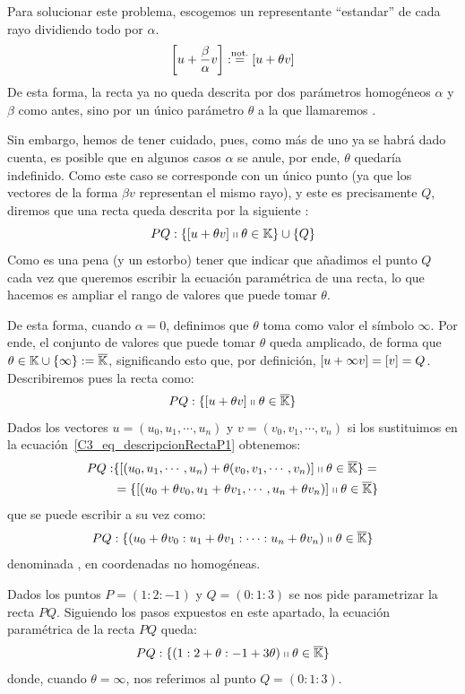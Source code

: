 Para solucionar este problema, escogemos un representante ``estandar'' de cada rayo dividiendo todo por $\alpha$.
\[\left [ u+\frac{\beta}{\alpha}v \right ]:\stackrel{\textrm{not.}}{=}\left [ u+\theta v \right ]\]
De esta forma, la recta ya no queda descrita por dos parámetros homogéneos $\alpha$ y $\beta$ como antes, sino por un único parámetro $\theta$ a la que llamaremos .
	
Sin embargo, hemos de tener cuidado, pues, como más de uno ya se habrá dado cuenta, es posible que en algunos casos $\alpha$ se anule, por ende, $\theta$ quedaría indefinido. Como este caso se corresponde con un único punto (ya que los vectores de la forma $\beta v$ representan el mismo rayo), y este es precisamente $Q$, diremos que una recta queda descrita por la siguiente :
\begin{equation}
	\label{C3_eq_descripcionRecta}
	PQ:\{\left [ u+\theta v \right ]\shortparallel \theta\in\mathbb{K}\}\cup\{Q\}
\end{equation}
Como es una pena (y un estorbo) tener que indicar que añadimos el punto $Q$ cada vez que queremos escribir la ecuación paramétrica de una recta, lo que hacemos es ampliar el rango de valores que puede tomar $\theta$.

De esta forma, cuando $\alpha=0$, definimos que $\theta$ toma como valor el símbolo $\infty$. Por ende, el conjunto de valores que puede tomar $\theta$ queda amplicado, de forma que $\theta\in\mathbb{K}\cup\{\infty\}:=\overline{\mathbb{K}}$, significando esto que, por definición, $\left [ u+\infty v \right ]=\left [ v \right ]=Q$. Describiremos pues la recta como:
\begin{equation}
	\label{C3_eq_descripcionRectaP1}
	PQ:\{\left [ u+\theta v \right ]\shortparallel \theta\in\overline{\mathbb{K}}\}
\end{equation}
Dados los vectores $u=(u_0,u_1,\cdots,u_n)$ y $v=(v_0,v_1,\cdots,v_n)$ si los sustituimos en la ecuación~\eqref{C3_eq_descripcionRectaP1} obtenemos:
\begin{equation*}
	\label{C_3_eq_parametrica_recta}
	\begin{split}
		PQ:&\{\left [ (u_0,u_1,\cdots,u_n)+\theta(v_0,v_1,\cdots,v_n) \right ]\shortparallel \theta\in\overline{\mathbb{K}}\}=\\
		&=\{\left [ (u_0+\theta v_0,u_1+\theta v_1,\cdots,u_n+\theta v_n) \right ]\shortparallel \theta\in\overline{\mathbb{K}}\}
	\end{split}
\end{equation*}
que se puede escribir a su vez como: 
\begin{equation}
	PQ:\{(u_0+\theta v_0:u_1+\theta v_1:\cdots:u_n+\theta v_n)\shortparallel \theta\in\overline{\mathbb{K}}\}
\end{equation}
denominada , en coordenadas no homogéneas.
\begin{exa}
	\label{C3_exa_rectaConcreta}
	Dados los puntos $P=(1:2:-1)$ y $Q=(0:1:3)$ se nos pide parametrizar la recta $PQ$. Siguiendo los pasos expuestos en este apartado, la ecuación paramétrica de la recta $PQ$ queda:
	\[
	PQ:\{(1:2+\theta:-1+3\theta)\shortparallel\theta\in\overline{\mathbb{K}}\}
	\]
	donde, cuando $\theta=\infty$, nos referimos al punto $Q=(0:1:3)$.
\end{exa}

